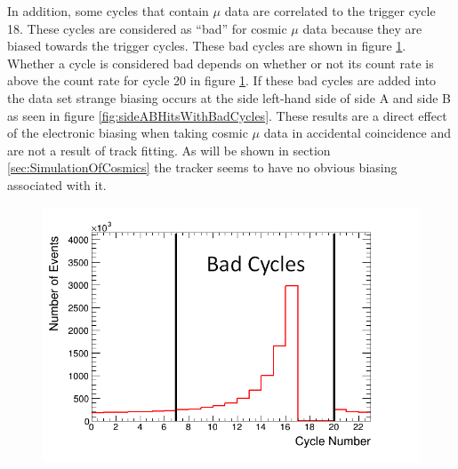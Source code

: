 
In addition, some cycles that contain $\mu$ data are correlated to the trigger cycle 18. These cycles are considered as ``bad'' for cosmic $\mu$ data because they are biased towards the trigger cycles. These bad cycles are shown in figure \ref{fig:badCycles}. Whether a cycle is considered bad depends on whether or not its count rate is above the count rate for cycle 20 in figure \ref{fig:badCycles}. If these bad cycles are added into the data set strange biasing occurs at the side left-hand side of side A and side B as seen in figure \ref{fig:sideABHitsWithBadCycles}. These results are a direct effect of the electronic biasing when taking cosmic $\mu$ data in accidental coincidence and are not a result of track fitting. As will be shown in section \ref{sec:SimulationOfCosmics} the tracker seems to have no obvious biasing associated with it. %

\begin{figure}[!h]
 \centering
 \includegraphics[width=0.7\linewidth]{Chapter6/Figs/badCyclesRedo.png}
 \label{fig:badCycles}
\end{figure}

